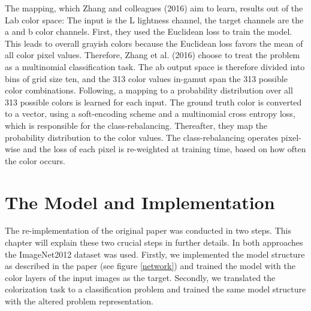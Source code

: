 \documentclass[12pt,letterpaper]{article}
\begin{document}
The mapping, which Zhang and colleagues (2016) aim to learn, results out of the  Lab color space: The input is the L lightness channel, the target channels are the a and b color channels. First, they used the Euclidean loss to train the model. This leads to overall grayish colors because the Euclidean loss favors the mean of all color pixel values. Therefore, Zhang et al. (2016) choose to treat the problem as a multinomial classification task. The ab output space is therefore divided into bins of grid size ten, and the 313 color values in-gamut span the 313 possible color combinations. Following, a mapping to a probability distribution over all 313 possible colors is learned for each input. The ground truth color is converted to a vector, using a soft-encoding scheme and a multinomial cross entropy loss, which is responsible for the class-rebalancing. Thereafter, they map the probability distribution to the color values. The class-rebalancing operates pixel-wise and the loss of each pixel is re-weighted at training time, based on how often the color occurs.

\section{The Model and Implementation}
The re-implementation of the original paper \citep{Zhang.2016} was conducted in two steps. This chapter will explain these two crucial steps in further details. In both approaches the ImageNet2012 dataset was used. Firstly, we implemented the model structure as described in the paper (see figure \ref{network}) and trained the model with the color layers of the input images as the target. Secondly, we translated the colorization task to a classification problem and trained the same model structure with the altered problem representation.
\end{document}
